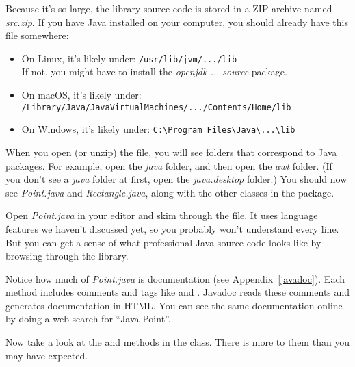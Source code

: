 Because it's so large, the library source code is stored in a ZIP archive named {\it src.zip}.
If you have Java installed on your computer, you should already have this file somewhere:

\begin{itemize}
\item On Linux, it's likely under: \verb"/usr/lib/jvm/.../lib"
\\ If not, you might have to install the {\it openjdk-...-source} package.

\item On macOS, it's likely under: \\ \verb"/Library/Java/JavaVirtualMachines/.../Contents/Home/lib"

\item On Windows, it's likely under: \verb"C:\Program Files\Java\...\lib"
\end{itemize}

When you open (or unzip) the file, you will see folders that correspond to Java packages.
For example, open the {\it java} folder, and then open the {\it awt} folder.
(If you don't see a {\it java} folder at first, open the {\it java.desktop} folder.)
You should now see {\it Point.java} and {\it Rectangle.java}, along with the other classes in the  package.

Open {\it Point.java} in your editor and skim through the file.
It uses language features we haven't discussed yet, so you probably won't understand every line.
But you can get a sense of what professional Java source code looks like by browsing through the library.


Notice how much of {\it Point.java} is documentation (see Appendix~\ref{javadoc}).
Each method includes comments and tags like  and .
Javadoc reads these comments and generates documentation in HTML.
You can see the same documentation online by doing a web search for ``Java Point''.

Now take a look at the  and  methods in the  class.
There is more to them than you may have expected.




